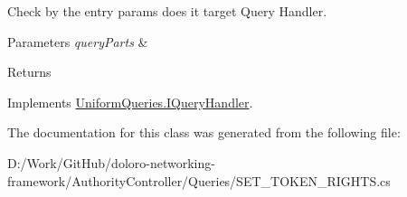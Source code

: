 Check by the entry params does it target Query Handler. 


\begin{DoxyParams}{Parameters}
{\em query\+Parts} & \\
\hline
\end{DoxyParams}
\begin{DoxyReturn}{Returns}

\end{DoxyReturn}


Implements \mbox{\hyperlink{interface_uniform_queries_1_1_i_query_handler_abda1ccf47ad2889fbd015955965046e7}{Uniform\+Queries.\+I\+Query\+Handler}}.



The documentation for this class was generated from the following file\+:\begin{DoxyCompactItemize}
\item 
D\+:/\+Work/\+Git\+Hub/doloro-\/networking-\/framework/\+Authority\+Controller/\+Queries/S\+E\+T\+\_\+\+T\+O\+K\+E\+N\+\_\+\+R\+I\+G\+H\+T\+S.\+cs\end{DoxyCompactItemize}
